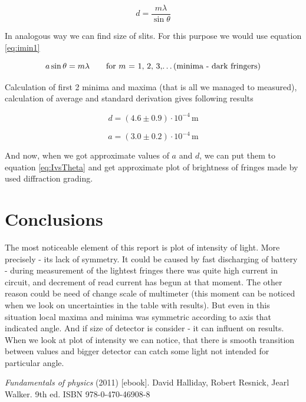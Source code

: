 \documentclass[a4paper,12pt]{article}
\begin{document}
\begin{equation}
    d = \frac{m \lambda}{\sin \theta} \label{eq:imax2}
\end{equation}

In analogous way we can find size of slits. For this purpose we would use equation \ref{eq:imin1}

\begin{equation}
    a \sin \theta = m \lambda \qquad \textrm{for $m$ = 1, 2, 3,\dots (minima - dark fringers)} \label{eq:imin1}
\end{equation}


Calculation of first 2 minima and maxima (that is all we managed to measured), calculation of average and standard derivation gives following results

\begin{displaymath}
    d = (4.6 \pm 0.9) \cdot 10^{-4} \, \mathrm{m}
\end{displaymath}

\begin{displaymath}
    a = (3.0 \pm 0.2) \cdot 10^{-4} \, \mathrm{m}
\end{displaymath}


And now, when we got approximate values of $a$ and $d$, we can put them to equation \ref{eq:IvsTheta} and get approximate plot of brightness of fringes made by used diffraction grading.

\section{Conclusions}
The most noticeable element of this report is plot of intensity of light. More precisely - its lack of symmetry. It could be caused by fast discharging of battery - during measurement of the lightest fringes there was quite high current in circuit, and decrement of read current has begun at that moment. The other reason could be need of change scale of multimeter (this moment can be noticed when we look on uncertainties in the table with results). But even in this situation local maxima and minima was symmetric according to axis that indicated angle. And if size of detector is consider - it can influent on results. When we look at plot of intensity we can notice, that there is smooth transition between values and bigger detector can catch some light not intended for particular angle.       


\begin{thebibliography}{9}
    \emph{Fundamentals of physics} (2011) [ebook]. David Halliday, Robert Resnick, Jearl Walker. 9th ed. ISBN 978-0-470-46908-8
\end{thebibliography}
\end{document}
